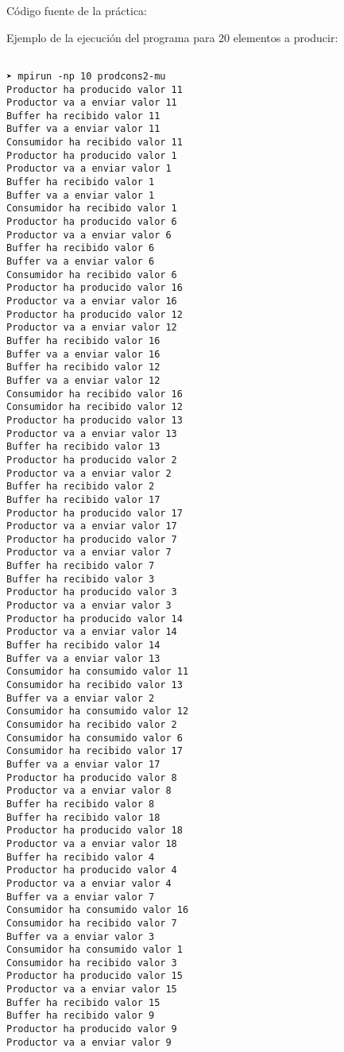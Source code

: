 \documentclass[12pt,a4paper]{article}
\begin{document}
Código fuente de la práctica:



Ejemplo de la ejecución del programa para 20 elementos a producir:

\begin{verbatim}

➤ mpirun -np 10 prodcons2-mu 
Productor ha producido valor 11
Productor va a enviar valor 11
Buffer ha recibido valor 11
Buffer va a enviar valor 11
Consumidor ha recibido valor 11
Productor ha producido valor 1
Productor va a enviar valor 1
Buffer ha recibido valor 1
Buffer va a enviar valor 1
Consumidor ha recibido valor 1
Productor ha producido valor 6
Productor va a enviar valor 6
Buffer ha recibido valor 6
Buffer va a enviar valor 6
Consumidor ha recibido valor 6
Productor ha producido valor 16
Productor va a enviar valor 16
Productor ha producido valor 12
Productor va a enviar valor 12
Buffer ha recibido valor 16
Buffer va a enviar valor 16
Buffer ha recibido valor 12
Buffer va a enviar valor 12
Consumidor ha recibido valor 16
Consumidor ha recibido valor 12
Productor ha producido valor 13
Productor va a enviar valor 13
Buffer ha recibido valor 13
Productor ha producido valor 2
Productor va a enviar valor 2
Buffer ha recibido valor 2
Buffer ha recibido valor 17
Productor ha producido valor 17
Productor va a enviar valor 17
Productor ha producido valor 7
Productor va a enviar valor 7
Buffer ha recibido valor 7
Buffer ha recibido valor 3
Productor ha producido valor 3
Productor va a enviar valor 3
Productor ha producido valor 14
Productor va a enviar valor 14
Buffer ha recibido valor 14
Buffer va a enviar valor 13
Consumidor ha consumido valor 11
Consumidor ha recibido valor 13
Buffer va a enviar valor 2
Consumidor ha consumido valor 12
Consumidor ha recibido valor 2
Consumidor ha consumido valor 6
Consumidor ha recibido valor 17
Buffer va a enviar valor 17
Productor ha producido valor 8
Productor va a enviar valor 8
Buffer ha recibido valor 8
Buffer ha recibido valor 18
Productor ha producido valor 18
Productor va a enviar valor 18
Buffer ha recibido valor 4
Productor ha producido valor 4
Productor va a enviar valor 4
Buffer va a enviar valor 7
Consumidor ha consumido valor 16
Consumidor ha recibido valor 7
Buffer va a enviar valor 3
Consumidor ha consumido valor 1
Consumidor ha recibido valor 3
Productor ha producido valor 15
Productor va a enviar valor 15
Buffer ha recibido valor 15
Buffer ha recibido valor 9
Productor ha producido valor 9
Productor va a enviar valor 9

\end{verbatim}
\end{document}
